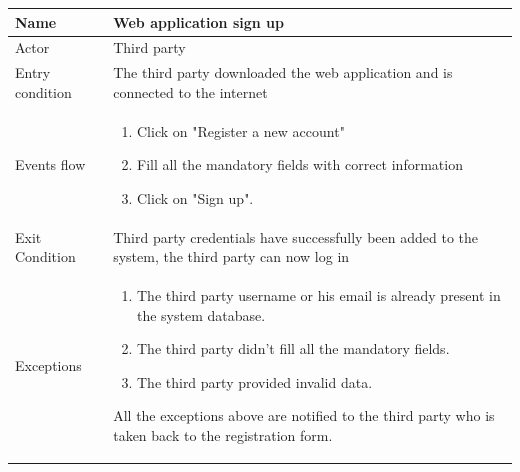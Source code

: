\begin{table}[p]
\centering
\begin{tabular}{|l|p{11cm}|}
    \hline
    Name & Web application sign up
    \\ \hline
    Actor & Third party
    \\ \hline 
    Entry condition & The third party downloaded the web application and is connected to the internet
    \\ \hline
    Events flow &
    \begin{enumerate}
    \item Click on "Register a new account"
    \item Fill all the mandatory fields with correct information
    \item Click on "Sign up".
    \end{enumerate}
     \\ \hline
     Exit Condition & Third party credentials have successfully been added to the system,
     the third party can now log in     
     \\
    \hline
    Exceptions &
        \begin{enumerate}
    \item The third party username or his email is already present in the system database.
    \item The third party didn't fill all the mandatory fields.
    \item The third party provided invalid data.
    \end{enumerate}
    All the exceptions above are notified to the third party who is taken back to the registration form.
      \\
    \hline
\end{tabular}
\end{table}

